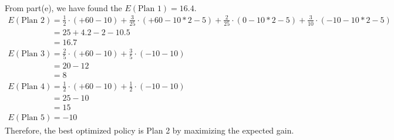 \documentclass[preprint,12pt]{elsarticle}
\begin{document}
\begin{enumerate}[label=\alph*]
		\\ From part(e), we have found the $E(\text{Plan 1}) = 16.4$.
		\begin{align*}
			E(\text{Plan 2}) &= \frac{1}{2}\cdot (+60-10) + \frac{3}{25}\cdot (+60-10*2-5) + \frac{2}{25}\cdot (0-10*2-5) + \frac{3}{10}\cdot (-10-10*2-5)\\
			&= 25 + 4.2 - 2 - 10.5\\
			&= 16.7\\
			E(\text{Plan 3}) &= \frac{2}{5} \cdot (+60-10) + \frac{3}{5} \cdot (-10-10)\\
			&= 20 - 12\\
			&= 8\\
			E(\text{Plan 4}) &= \frac{1}{2} \cdot (+60-10) + \frac{1}{2} \cdot (-10-10)\\
			&= 25 - 10\\
			&= 15\\
			E(\text{Plan 5}) &= -10
		\end{align*}
		Therefore, the best optimized policy is Plan 2 by maximizing the expected gain.

		
	\end{enumerate}
	
\end{document}
